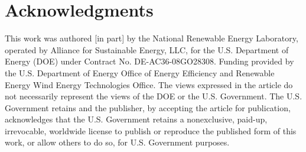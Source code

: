 \documentclass[conf]{new-aiaa}
\begin{document}




\section*{Acknowledgments}
This work was authored [in part] by the National Renewable Energy Laboratory, operated by Alliance for Sustainable Energy, LLC, for the U.S. Department of Energy (DOE) under Contract No. DE-AC36-08GO28308. Funding provided by the U.S. Department of Energy Office of Energy Efficiency and Renewable Energy Wind Energy Technologies Office. The views expressed in the article do not necessarily represent the views of the DOE or the U.S. Government. The U.S. Government retains and the publisher, by accepting the article for publication, acknowledges that the U.S. Government retains a nonexclusive, paid-up, irrevocable, worldwide license to publish or reproduce the published form of this work, or allow others to do so, for U.S. Government purposes.
\end{document}
